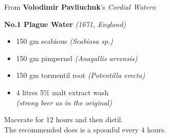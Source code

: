 \documentclass[11pt]{report}
\begin{document}
\begin{titlepage}
\begin{multicols}{3}
\raggedcolumns
{}

{
    From \textbf{Volodimir Pavliuchuk}'s \emph{Cordial Waters}:\\
}

\vspace*{2\baselineskip}

{
    \textbf{No.1 Plague Water} \emph{(1671, England)}
    \vspace*{\baselineskip}
    \begin{itemize}
        \renewcommand{\labelitemi}{$\circ$}
        \item 150 gm scabious \emph{(Scabiosa sp.)}
        \item 150 gm pimpernel \emph{(Anagallis arvensis)}
        \item 150 gm tormentil root \emph{(Potentilla erecta)}
        \item 4 litres 5\% malt extract wash\\
            [0.4\baselineskip]
            \emph{(strong beer as in the original)}
    \end{itemize}
    \vspace*{\baselineskip}
    Macerate for 12 hours and then distil.\\
    The recommended does is a spoonful every 4 hours.
}

\columnbreak
\vspace*{3.2\baselineskip}


\end{multicols}
\end{titlepage}
\end{document}
